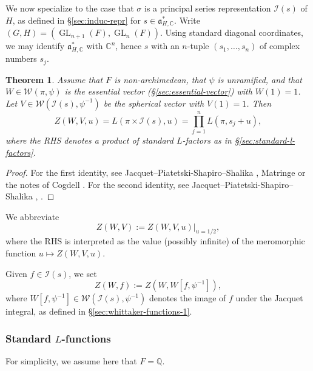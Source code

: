 \documentclass[reqno]{amsart}
\DeclareMathOperator{\GL}{GL}
\theoremstyle{plain} \newtheorem{theorem} {Theorem}
\theoremstyle{definition} \newtheorem{definition} [theorem] {Definition}
\theoremstyle{itplain} %
\numberwithin{equation}{section}
\numberwithin{theorem}{section}
\begin{document}
We now specialize to the case that $\sigma$ is a principal series representation $\mathcal{I}(s)$ of $H$, as defined in \S\ref{sec:induc-repr} for $s \in \mathfrak{a}_{H,\mathbb{C}}^*$.  Write $(G,H) = (\GL_{n+1}(F), \GL_n(F))$.  Using standard diagonal coordinates, we may identify $\mathfrak{a}_{H,\mathbb{C}}^*$ with $\mathbb{C}^n$, hence $s$ with an $n$-tuple $(s_1,\dotsc,s_n)$ of complex numbers $s_j$.
\begin{theorem}\label{thm:jpss-essential-vector-factorized}
  Assume that $F$ is non-archimedean, that $\psi$ is unramified, and that $W \in \mathcal{W}(\pi,\psi)$ is the essential vector (\S\ref{sec:essential-vector}) with $W(1) = 1$.  Let $V \in \mathcal{W}(\mathcal{I}(s), \psi^{-1})$ be the spherical vector with $V(1) = 1$.  Then
  \begin{equation*}
    Z(W,V, u) = L(\pi \times \mathcal{I}(s), u) = \prod_{j=1}^{n} L(\pi, s_j + u),
  \end{equation*}
  where the RHS denotes a product of standard $L$-factors as in \S\ref{sec:standard-l-factors}.
\end{theorem}
\begin{proof}
  For the first identity, see Jacquet--Piatetski-Shapiro--Shalika \cite[p208]{MR620708}, Matringe \cite[Cor 3.3]{MR3138844} or the notes of Cogdell \cite[Thm 3.3]{MR2508768}.  For the second identity, see Jacquet--Piatetski-Shapiro--Shalika \cite[\S9.4, \S8.4, \S5.1]{MR701565}, \cite[Thm 4.3]{MR519356}.
\end{proof}


We abbreviate
\begin{equation*}
  Z(W,V) := Z(W,V,u)|_{u=1/2},
\end{equation*}
where the RHS is interpreted as the value (possibly infinite) of the meromorphic function $u \mapsto Z(W,V,u)$.  

Given $f \in \mathcal{I}(s)$, we set
\begin{equation*}
  Z(W,f) := Z(W, W[f,\psi^{-1}]),
\end{equation*}
where $W[f,\psi^{-1}] \in \mathcal{W}(\mathcal{I}(s), \psi^{-1})$ denotes the image of $f$ under the Jacquet integral, as defined in \S\ref{sec:whittaker-functions-1}.  



\subsubsection{Standard $L$-functions}\label{sec:standard-l-functions}
For simplicity, we assume here that $F = \mathbb{Q}$.
\end{document}
